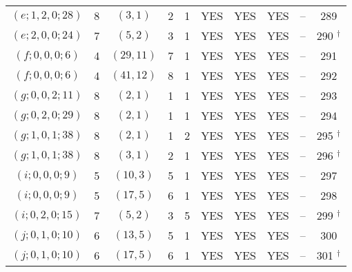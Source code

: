 \begin{longtable}{|c|c|c|c|c|c|c|c|c|c|}
$(e; 1, 2, 0; 28)$ & 8 & $(3, 1)$ & 2 & 1 & YES & YES & YES & -- & 289\\
$(e; 2, 0, 0; 24)$ & 7 & $(5, 2)$ & 3 & 1 & YES & YES & YES & -- & 290 ${}^\dagger$\\
$(f; 0, 0, 0; 6)$ & 4 & $(29, 11)$ & 7 & 1 & YES & YES & YES & -- & 291\\
$(f; 0, 0, 0; 6)$ & 4 & $(41, 12)$ & 8 & 1 & YES & YES & YES & -- & 292\\
$(g; 0, 0, 2; 11)$ & 8 & $(2, 1)$ & 1 & 1 & YES & YES & YES & -- & 293\\
$(g; 0, 2, 0; 29)$ & 8 & $(2, 1)$ & 1 & 1 & YES & YES & YES & -- & 294\\
$(g; 1, 0, 1; 38)$ & 8 & $(2, 1)$ & 1 & 2 & YES & YES & YES & -- & 295 ${}^\dagger$\\
$(g; 1, 0, 1; 38)$ & 8 & $(3, 1)$ & 2 & 1 & YES & YES & YES & -- & 296 ${}^\dagger$\\
$(i; 0, 0, 0; 9)$ & 5 & $(10, 3)$ & 5 & 1 & YES & YES & YES & -- & 297\\
$(i; 0, 0, 0; 9)$ & 5 & $(17, 5)$ & 6 & 1 & YES & YES & YES & -- & 298\\
$(i; 0, 2, 0; 15)$ & 7 & $(5, 2)$ & 3 & 5 & YES & YES & YES & -- & 299 ${}^\dagger$\\
$(j; 0, 1, 0; 10)$ & 6 & $(13, 5)$ & 5 & 1 & YES & YES & YES & -- & 300\\
$(j; 0, 1, 0; 10)$ & 6 & $(17, 5)$ & 6 & 1 & YES & YES & YES & -- & 301 ${}^\dagger$
\end{longtable}

